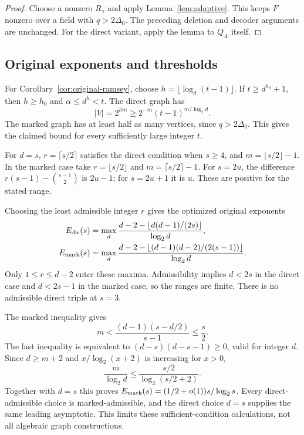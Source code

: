 \documentclass[11pt,a4paper]{article}
\theoremstyle{definition}
\theoremstyle{remark}
\numberwithin{equation}{section}
\begin{document}
\begin{proof}
Choose a nonzero $R_\gamma$ and apply Lemma~\ref{lem:adaptive}. This keeps $F$ nonzero over a field with $q>2\Delta_0$. The preceding deletion and decoder arguments are unchanged. For the direct variant, apply the lemma to $Q_A$ itself.
\end{proof}

\subsection{Original exponents and thresholds}\label{sec:original-exponents}
For Corollary~\ref{cor:original-ramsey}, choose $h=\lfloor\log_d(t-1)\rfloor$. If $t\ge d^{h_0}+1$, then $h\ge h_0$ and $\alpha\le d^h<t$. The direct graph has
\[
|V|=2^{hm}\ge2^{-m}(t-1)^{m/\log_2d}.
\]
The marked graph has at least half as many vertices, since $q>2\Delta_0$. This gives the claimed bound for every sufficiently large integer $t$.

For $d=s$, $r=\lceil s/2\rceil$ satisfies the direct condition when $s\ge4$, and $m=\lfloor s/2\rfloor-1$. In the marked case take $r=\lfloor s/2\rfloor$ and $m=\lceil s/2\rceil-1$. For $s=2u$, the difference $r(s-1)-\binom{s-1}2$ is $2u-1$; for $s=2u+1$ it is $u$. These are positive for the stated range.

Choosing the least admissible integer $r$ gives the optimized original exponents
\begin{align}\label{eq:old-optimized}
E_{\rm dir}(s)&=\max_d\frac{d-2-\lfloor d(d-1)/(2s)\rfloor}{\log_2d},\notag\\
E_{\rm mark}(s)&=\max_d\frac{d-2-\lfloor(d-1)(d-2)/(2(s-1))\rfloor}{\log_2d}.
\end{align}
Only $1\le r\le d-2$ enter these maxima. Admissibility implies $d<2s$ in the direct case and $d<2s-1$ in the marked case, so the ranges are finite. There is no admissible direct triple at $s=3$.

The marked inequality gives
\[
m<\frac{(d-1)(s-d/2)}{s-1}\le\frac s2.
\]
The last inequality is equivalent to $(d-s)(d-s-1)\ge0$, valid for integer $d$. Since $d\ge m+2$ and $x/\log_2(x+2)$ is increasing for $x>0$,
\[
\frac m{\log_2d}\le\frac{s/2}{\log_2(s/2+2)}.
\]
Together with $d=s$ this proves $E_{\rm mark}(s)=(1/2+o(1))s/\log_2s$. Every direct-admissible choice is marked-admissible, and the direct choice $d=s$ supplies the same leading asymptotic. This limits these sufficient-condition calculations, not all algebraic graph constructions.
\end{document}
